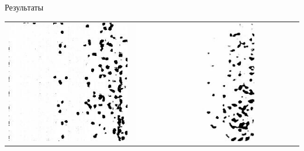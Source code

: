 \documentclass[12pt]{beamer}
\begin{document}
\begin{frame}{Результаты}
\begin{table}
\begin{center}
\begin{tabular}{p{1.2cm} p{1.2cm} p{1.2cm} p{1.2cm} p{1.2cm} p{1.2cm} p{1.2cm}}
					\includegraphics[width=1\linewidth]{8-results/sand-trend2/nf16/gen3}
					&
					\includegraphics[width=1\linewidth]{8-results/sand-trend2/nf16_woUnet/gen3}
					&

\end{tabular}
\end{center}
\end{table}
\end{frame}
\end{document}
